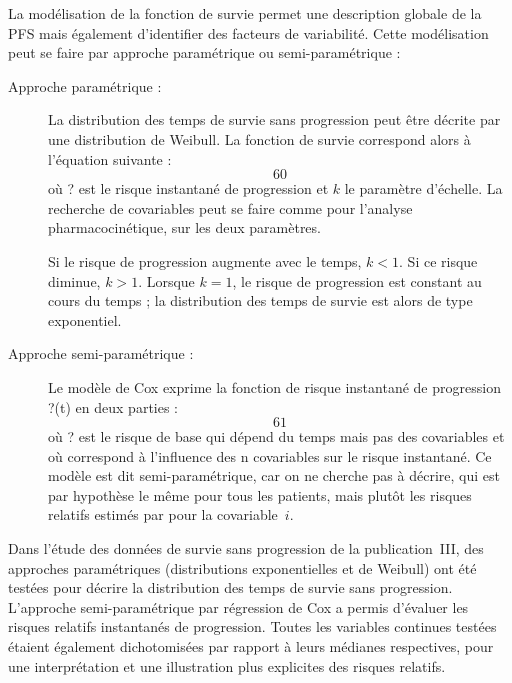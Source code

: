 La modélisation de la fonction de survie permet une description globale de la PFS mais également d'identifier des facteurs de variabilité. Cette modélisation peut se faire par approche paramétrique ou semi-paramétrique :
\begin{description}
\item[Approche paramétrique :] La distribution des temps de survie sans progression peut être décrite par une distribution de Weibull. La fonction de survie correspond alors à l'équation suivante : 
\begin{equation}
60
\end{equation}
où ? est le risque instantané de progression et $k$ le paramètre d'échelle. La recherche de covariables peut se faire comme pour l'analyse pharmacocinétique, sur les deux paramètres. 

Si le risque de progression augmente avec le temps, $k < 1$. Si ce risque diminue, $k > 1$. Lorsque $k = 1$, le risque de progression est constant au cours du temps ; la distribution des temps de survie est alors de type exponentiel.
\item[Approche semi-paramétrique :] Le modèle de Cox exprime la fonction de risque instantané de progression ?(t) en deux parties : 
\begin{equation}
61
\end{equation}
où ? est le risque de base qui dépend du temps mais pas des covariables et où  correspond à l'influence des n covariables sur le risque instantané. Ce modèle est dit semi-paramétrique, car on ne cherche pas à décrire, qui est par hypothèse le même pour tous les patients, mais plutôt les risques relatifs estimés par  pour la covariable~$i$.
\end{description}
Dans l'étude des données de survie sans progression de la publication~III, des approches paramétriques (distributions exponentielles et de Weibull) ont été testées pour décrire la distribution des temps de survie sans progression. L'approche semi-paramétrique par régression de Cox a permis d'évaluer les risques relatifs instantanés de progression. Toutes les variables continues testées étaient également dichotomisées par rapport à leurs médianes respectives, pour une interprétation et une illustration plus explicites des risques relatifs. 

